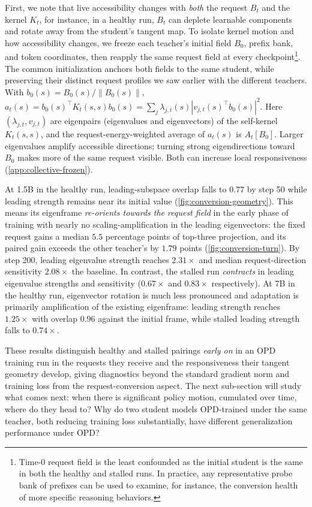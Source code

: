 First, we note that live accessibility changes with \emph{both} the request $B_t$ and the kernel $K_t$, for instance, in a healthy run, $B_t$ can deplete learnable components and rotate away from the student's tangent map. To isolate kernel motion and how accessibility changes, we freeze each teacher's initial field $B_0$, prefix bank, and token coordinates, then reapply the same request field at every checkpoint\footnote{Time-$0$ request field is the least confounded as the initial student is the same in both the healthy and stalled runs. In practice, any representative probe bank of prefixes can be used to examine, for instance, the conversion health of more specific reasoning behaviors.}. The common initialization anchors both fields to the same student, while preserving their distinct request profiles we saw earlier with the different teachers. With $b_0(s)=B_0(s)/\|B_0(s)\|$,
$a_t(s)=b_0(s)^\top K_t(s,s)b_0(s)
       =\sum_j\lambda_{j,t}(s)|v_{j,t}(s)^\top b_0(s)|^2.
$
Here $(\lambda_{j,t},v_{j,t})$ are eigenpairs (eigenvalues and eigenvectors) of the self-kernel $K_t(s,s)$, and the request-energy-weighted average of $a_t(s)$ is $A_t[B_0]$. Larger eigenvalues amplify accessible directions; turning strong eigendirections toward $B_0$ makes more of the same request visible. Both can increase local responsiveness (\cref{app:collective-frozen}).



At 1.5B in the healthy run, leading-subspace overlap falls to $0.77$ by step 50 while leading strength remains near its initial value (\cref{fig:conversion-geometry}). This means its eigenframe \emph{re-orients towards the request field} in the early phase of training with nearly no scaling-amplification in the leading eigenvectors: the fixed request gains a median $5.5$ percentage points of top-three projection, and its paired gain exceeds the other teacher's by $1.79$ points (\cref{fig:conversion-turn}). 
By step 200, leading eigenvalue strength reaches $2.31\times$ and median request-direction sensitivity $2.08\times$ the baseline. In contrast, the stalled run \emph{contracts} in leading eigenvalue strengths and sensitivity ($0.67\times$ and $0.83\times$ respectively). 
At 7B in the healthy run, eigenvector rotation is much less pronounced and adaptation is primarily amplification of the existing eigenframe: leading strength reaches $1.25\times$ with overlap $0.96$ against the initial frame, while stalled leading strength falls to $0.74\times$.

These results distinguish healthy and stalled pairings \emph{early on} in an OPD training run in the requests they receive and the responsiveness their tangent geometry develop, giving diagnostics beyond the standard gradient norm and training loss from the request-conversion aspect. The next sub-section will study what comes next: when there is significant policy motion, cumulated over time, where do they head to? Why do two student models OPD-trained under the same teacher, both reducing training loss substantially, have different generalization performance under OPD?
